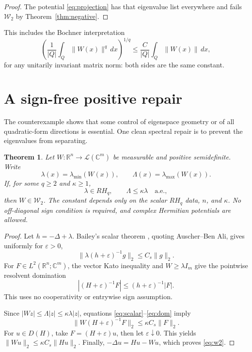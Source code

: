 \documentclass[11pt]{article}
\newtheorem{theorem}{Theorem}
\newcommand{\R}{\mathbb R}
\newcommand{\C}{\mathbb C}
\newcommand{\Wtwo}{\mathcal W_2}
\begin{document}
\begin{proof}
The potential \eqref{eq:projection} has that eigenvalue list everywhere and
fails $\Wtwo$ by Theorem~\ref{thm:negative}.
\end{proof}

This includes the Bochner interpretation
\[
 \left(\frac1{|Q|}\int_Q\|W(x)\|^q\,dx\right)^{1/q}
 \le \frac{C}{|Q|}\int_Q\|W(x)\|\,dx,
\]
for any unitarily invariant matrix norm: both sides are the same constant.

\section{A sign-free positive repair}

The counterexample shows that some control of eigenspace geometry or of all
quadratic-form directions is essential. One clean spectral repair is to
prevent the eigenvalues from separating.

\begin{theorem}\label{thm:positive}
Let $W:\R^n\to\mathcal L(\C^m)$ be measurable and positive semidefinite.
Write
\[
 \lambda(x)=\lambda_{\min}(W(x)),\qquad
 \Lambda(x)=\lambda_{\max}(W(x)).
\]
If, for some $q\ge2$ and $\kappa\ge1$,
\[
 \lambda\in RH_q,\qquad \Lambda\le\kappa\lambda\quad\text{a.e.},
\]
then $W\in\Wtwo$. The constant depends only on the scalar
$RH_q$ data, $n$, and $\kappa$. No off-diagonal sign condition is required,
and complex Hermitian potentials are allowed.
\end{theorem}

\begin{proof}
Let $h=-\Delta+\lambda$. Bailey's scalar theorem
\cite[Theorem~5.1]{Bailey}, quoting Auscher--Ben Ali, gives uniformly for
$\varepsilon>0$,
\begin{equation}\label{eq:scalar}
 \|\lambda(h+\varepsilon)^{-1}g\|_2\le C_s\|g\|_2.
\end{equation}
For $F\in L^2(\R^n;\C^m)$, the vector Kato inequality and
$W\ge\lambda I_m$ give the pointwise resolvent domination
\begin{equation}\label{eq:dom}
 |(H+\varepsilon)^{-1}F|
 \le (h+\varepsilon)^{-1}|F|.
\end{equation}
This uses no cooperativity or entrywise sign assumption.

Since $|Wz|\le\Lambda|z|\le\kappa\lambda|z|$, equations
\eqref{eq:scalar}--\eqref{eq:dom} imply
\[
 \|W(H+\varepsilon)^{-1}F\|_2\le\kappa C_s\|F\|_2.
\]
For $u\in D(H)$, take $F=(H+\varepsilon)u$, then let
$\varepsilon\downarrow0$. This yields
$\|Wu\|_2\le\kappa C_s\|Hu\|_2$. Finally,
$-\Delta u=Hu-Wu$, which proves \eqref{eq:w2}.
\end{proof}
\end{document}
